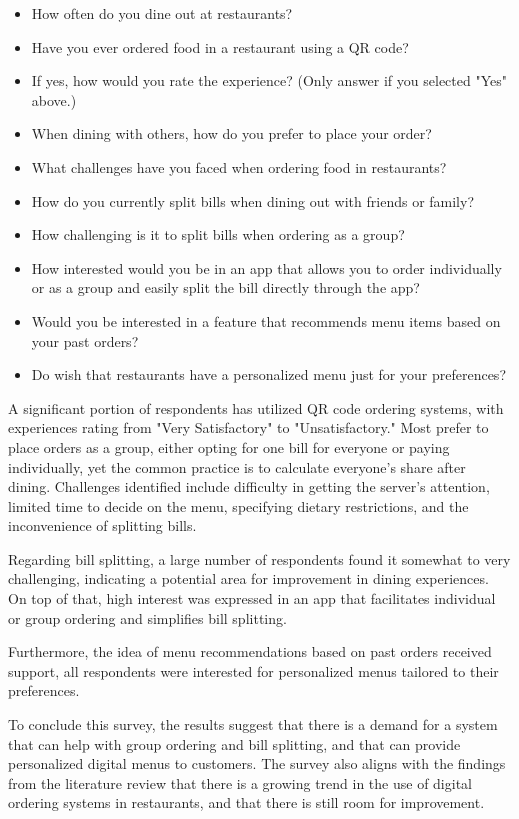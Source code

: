 \begin{itemize}
    \item How often do you dine out at restaurants?
    \item Have you ever ordered food in a restaurant using a QR code?
    \item If yes, how would you rate the experience? (Only answer if you selected "Yes" above.)
    \item When dining with others, how do you prefer to place your order?
    \item What challenges have you faced when ordering food in restaurants?
    \item How do you currently split bills when dining out with friends or family?
    \item How challenging is it to split bills when ordering as a group?
    \item How interested would you be in an app that allows you to order individually or as a group and easily split the bill directly through the app?
    \item Would you be interested in a feature that recommends menu items based on your past orders?
    \item Do wish that restaurants have a personalized menu just for your preferences?
\end{itemize}

A significant portion of respondents has utilized QR code ordering systems, with experiences rating from "Very Satisfactory" to "Unsatisfactory." Most prefer to place orders as a group, either opting for one bill for everyone or paying individually, yet the common practice is to calculate everyone's share after dining. Challenges identified include difficulty in getting the server's attention, limited time to decide on the menu, specifying dietary restrictions, and the inconvenience of splitting bills.

Regarding bill splitting, a large number of respondents found it somewhat to very challenging, indicating a potential area for improvement in dining experiences. On top of that, high interest was expressed in an app that facilitates individual or group ordering and simplifies bill splitting.

Furthermore, the idea of menu recommendations based on past orders received support, all respondents were interested for personalized menus tailored to their preferences.

To conclude this survey, the results suggest that there is a demand for a system that can help with group ordering and bill splitting, and that can provide personalized digital menus to customers. The survey also aligns with the findings from the literature review that there is a growing trend in the use of digital ordering systems in restaurants, and that there is still room for improvement.

